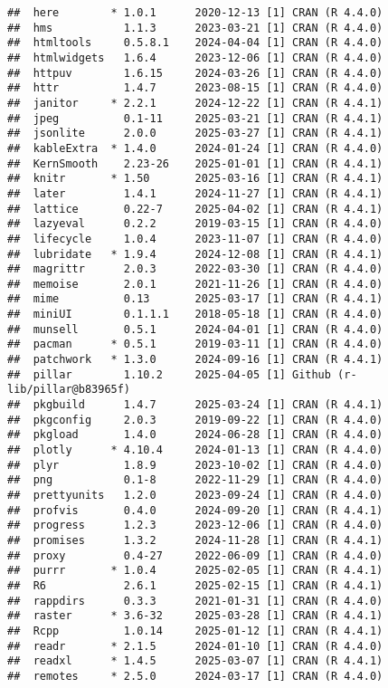 \documentclass[
]{article}
\begin{document}
\begin{verbatim}
##  here        * 1.0.1      2020-12-13 [1] CRAN (R 4.4.0)
##  hms           1.1.3      2023-03-21 [1] CRAN (R 4.4.0)
##  htmltools     0.5.8.1    2024-04-04 [1] CRAN (R 4.4.0)
##  htmlwidgets   1.6.4      2023-12-06 [1] CRAN (R 4.4.0)
##  httpuv        1.6.15     2024-03-26 [1] CRAN (R 4.4.0)
##  httr          1.4.7      2023-08-15 [1] CRAN (R 4.4.0)
##  janitor     * 2.2.1      2024-12-22 [1] CRAN (R 4.4.1)
##  jpeg          0.1-11     2025-03-21 [1] CRAN (R 4.4.1)
##  jsonlite      2.0.0      2025-03-27 [1] CRAN (R 4.4.1)
##  kableExtra  * 1.4.0      2024-01-24 [1] CRAN (R 4.4.0)
##  KernSmooth    2.23-26    2025-01-01 [1] CRAN (R 4.4.1)
##  knitr       * 1.50       2025-03-16 [1] CRAN (R 4.4.1)
##  later         1.4.1      2024-11-27 [1] CRAN (R 4.4.1)
##  lattice       0.22-7     2025-04-02 [1] CRAN (R 4.4.1)
##  lazyeval      0.2.2      2019-03-15 [1] CRAN (R 4.4.0)
##  lifecycle     1.0.4      2023-11-07 [1] CRAN (R 4.4.0)
##  lubridate   * 1.9.4      2024-12-08 [1] CRAN (R 4.4.1)
##  magrittr      2.0.3      2022-03-30 [1] CRAN (R 4.4.0)
##  memoise       2.0.1      2021-11-26 [1] CRAN (R 4.4.0)
##  mime          0.13       2025-03-17 [1] CRAN (R 4.4.1)
##  miniUI        0.1.1.1    2018-05-18 [1] CRAN (R 4.4.0)
##  munsell       0.5.1      2024-04-01 [1] CRAN (R 4.4.0)
##  pacman      * 0.5.1      2019-03-11 [1] CRAN (R 4.4.0)
##  patchwork   * 1.3.0      2024-09-16 [1] CRAN (R 4.4.1)
##  pillar        1.10.2     2025-04-05 [1] Github (r-lib/pillar@b83965f)
##  pkgbuild      1.4.7      2025-03-24 [1] CRAN (R 4.4.1)
##  pkgconfig     2.0.3      2019-09-22 [1] CRAN (R 4.4.0)
##  pkgload       1.4.0      2024-06-28 [1] CRAN (R 4.4.0)
##  plotly      * 4.10.4     2024-01-13 [1] CRAN (R 4.4.0)
##  plyr          1.8.9      2023-10-02 [1] CRAN (R 4.4.0)
##  png           0.1-8      2022-11-29 [1] CRAN (R 4.4.0)
##  prettyunits   1.2.0      2023-09-24 [1] CRAN (R 4.4.0)
##  profvis       0.4.0      2024-09-20 [1] CRAN (R 4.4.1)
##  progress      1.2.3      2023-12-06 [1] CRAN (R 4.4.0)
##  promises      1.3.2      2024-11-28 [1] CRAN (R 4.4.1)
##  proxy         0.4-27     2022-06-09 [1] CRAN (R 4.4.0)
##  purrr       * 1.0.4      2025-02-05 [1] CRAN (R 4.4.1)
##  R6            2.6.1      2025-02-15 [1] CRAN (R 4.4.1)
##  rappdirs      0.3.3      2021-01-31 [1] CRAN (R 4.4.0)
##  raster      * 3.6-32     2025-03-28 [1] CRAN (R 4.4.1)
##  Rcpp          1.0.14     2025-01-12 [1] CRAN (R 4.4.1)
##  readr       * 2.1.5      2024-01-10 [1] CRAN (R 4.4.0)
##  readxl      * 1.4.5      2025-03-07 [1] CRAN (R 4.4.1)
##  remotes     * 2.5.0      2024-03-17 [1] CRAN (R 4.4.0)

\end{verbatim}
\end{document}
